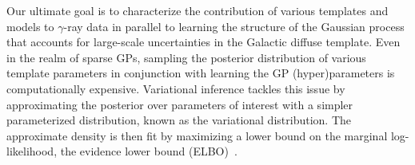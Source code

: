 \documentclass[]{article}
\begin{document}
Our ultimate goal is to characterize the contribution of various templates and models to $\gamma$-ray data in parallel to learning the structure of the Gaussian process that accounts for large-scale uncertainties in the Galactic diffuse template. Even in the realm of sparse GPs, sampling the posterior distribution of various template parameters in conjunction with learning the GP (hyper)parameters is computationally expensive. Variational inference tackles this issue by approximating the posterior over parameters of interest with a simpler parameterized distribution, known as the variational distribution. The approximate density is then fit by maximizing a lower bound on the marginal log-likelihood, the evidence lower bound (ELBO)~\cite{wingate_automated_2013,hoffman2013stochastic}. 

\end{document}

